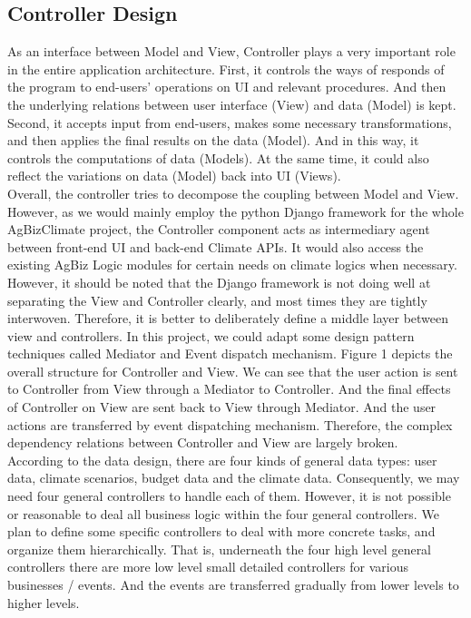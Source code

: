 \documentclass[onecolumn, draftclsnofoot,10pt, compsoc]{article}
\begin{document}
	\subsection{Controller Design}
	As an interface between Model and View, Controller plays a very important role in the entire application architecture. First, it controls the ways of responds of the program to end-users' operations on UI and relevant procedures. And then the underlying relations between user interface (View) and data (Model) is kept. Second, it accepts input from end-users, makes some necessary transformations, and then applies the final results on the data (Model). And in this way, it controls the computations of data (Models). At the same time, it could also reflect the variations on data (Model) back into UI (Views). \\
	Overall, the controller tries to decompose the coupling between Model and View. However, as we would mainly employ the python Django framework for the whole AgBizClimate project, the Controller component acts as intermediary agent between front-end UI and back-end Climate APIs. It would also access the existing AgBiz Logic modules for certain needs on climate logics when necessary. However, it should be noted that the Django framework is not doing well at separating the View and Controller clearly, and most times they are tightly interwoven. Therefore, it is better to deliberately define a middle layer between view and controllers. In this project, we could adapt some design pattern techniques called Mediator and Event dispatch mechanism. Figure 1 depicts the overall structure for Controller and View. We can see that the user action is sent to Controller from View through a Mediator to Controller. And the final effects of Controller on View are sent back to View through Mediator. And the user actions are transferred by event dispatching mechanism. Therefore, the complex dependency relations between Controller and View are largely broken.\\

	According to the data design, there are four kinds of general data types: user data, climate scenarios, budget data and the climate data. Consequently, we may need four general controllers to handle each of them. However, it is not possible or reasonable to deal all business logic within the four general controllers. We plan to define some specific controllers to deal with more concrete tasks, and organize them hierarchically. That is, underneath the four high level general controllers there are more low level small detailed controllers for various businesses / events. And the events are transferred gradually from lower levels to higher levels.
\end{document}
